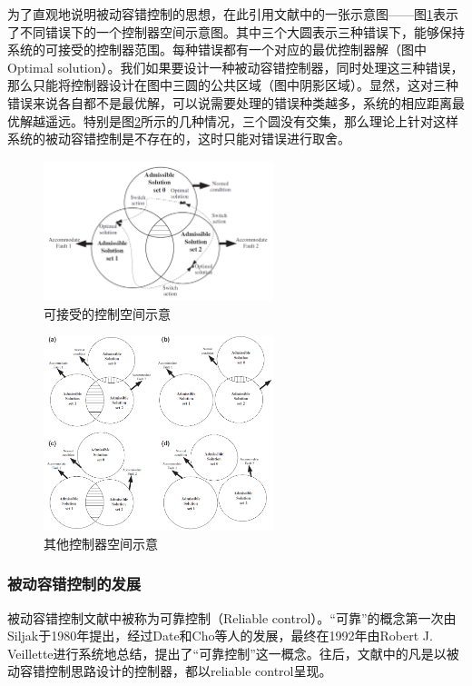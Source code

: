 \documentclass{article}
\begin{document}
为了直观地说明被动容错控制的思想，在此引用文献\cite{Jiang201260}中的一张示意图——图\ref{fig:asp}表示了不同错误下的一个控制器空间示意图。其中三个大圆表示三种错误下，能够保持系统的可接受的控制器范围。每种错误都有一个对应的最优控制器解（图中Optimal solution）。我们如果要设计一种被动容错控制器，同时处理这三种错误，那么只能将控制器设计在图中三圆的公共区域（图中阴影区域）。显然，这对三种错误来说各自都不是最优解，可以说需要处理的错误种类越多，系统的相应距离最优解越遥远。特别是图\ref{fig:aspoverlap}所示的几种情况，三个圆没有交集，那么理论上针对这样系统的被动容错控制是不存在的，这时只能对错误进行取舍。
\begin{figure}[!htp]
    \centering
    \includegraphics[width = 0.6\textwidth]{admissiblesp.png}
    \caption{可接受的控制空间示意\cite{Jiang201260}}
    \label{fig:asp}
\end{figure}
\begin{figure}[!htp]
    \centering
    \includegraphics[width = 0.6\textwidth]{aspoverlap.png}
    \caption{其他控制器空间示意\cite{Jiang201260}}
    \label{fig:aspoverlap}
\end{figure}

\subsubsection{被动容错控制的发展}
被动容错控制文献中被称为可靠控制（Reliable control）。“可靠”的概念第一次由Siljak于1980年提出\cite{siljak1980}，经过Date和Cho等人的发展\cite{70346,4790503}，最终在1992年由Robert J. Veillette进行系统地总结\cite{119629}，提出了“可靠控制”这一概念。往后，文献中的凡是以被动容错控制思路设计的控制器，都以reliable control呈现。
\end{document}

